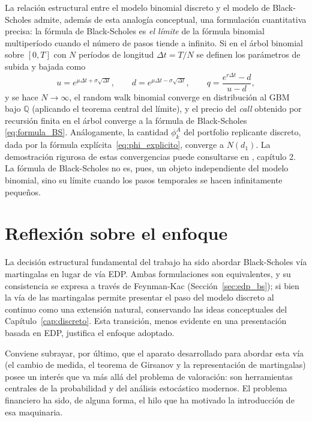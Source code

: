 \documentclass[11pt,a4paper,oneside]{report}
\theoremstyle{plain}
\theoremstyle{definition}
\theoremstyle{remark}
\newcommand{\Q}{\mathbb{Q}}
\newcommand{\1}{\mathbf{1}}
\begin{document}
La relación estructural entre el modelo binomial discreto y el modelo
de Black-Scholes admite, además de esta analogía conceptual, una formulación cuantitativa precisa: la fórmula de Black-Scholes es
\emph{el límite} de la fórmula binomial multiperíodo cuando el número
de pasos tiende a infinito. Si en el árbol binomial sobre $[0, T]$
con $N$ períodos de longitud $\Delta t = T/N$ se definen los
parámetros de subida y bajada como
\begin{equation*}
  u = e^{\mu\Delta t+\sigma\sqrt{\Delta t}}, \qquad
  d = e^{\mu\Delta t-\sigma\sqrt{\Delta t}}, \qquad
  q = \frac{e^{r \Delta t} - d}{u - d},
\end{equation*}
y se hace $N \to \infty$, el random walk binomial converge en
distribución al GBM bajo $\Q$ (aplicando el teorema central
del límite), y el precio del \emph{call} obtenido por recursión finita
en el árbol converge a la fórmula de Black-Scholes
\eqref{eq:formula_BS}. Análogamente, la cantidad $\phi_k^A$ del
portfolio replicante discreto, dada por la fórmula
explícita~\eqref{eq:phi_explicito}, converge a $N(d_1)$. La
demostración rigurosa de estas convergencias puede consultarse en \cite{etheridge}, capítulo 2. La fórmula
de Black-Scholes no es, pues, un objeto independiente del modelo
binomial, sino su límite cuando los pasos temporales se hacen
infinitamente pequeños.

\section{Reflexión sobre el enfoque}
\label{sec:reflexion_enfoque}

La decisión estructural fundamental del trabajo ha sido abordar
Black-Scholes vía martingalas en lugar de vía EDP. Ambas
formulaciones son equivalentes, y su consistencia se expresa a
través de Feynman-Kac (Sección~\ref{sec:edp_bs}); si bien la vía
de las martingalas permite presentar el paso del modelo discreto
al continuo como una extensión natural, conservando las ideas
conceptuales del Capítulo~\ref{cap:discreto}. Esta transición,
menos evidente en una presentación basada en EDP, justifica el enfoque adoptado.


Conviene subrayar, por último, que el aparato desarrollado para abordar
esta vía (el cambio de medida, el teorema de Girsanov y la
representación de martingalas) posee un interés que va más allá del
problema de valoración: son herramientas centrales de la probabilidad y
del análisis estocástico modernos. El problema financiero ha sido,
de alguna forma, el hilo que ha motivado la introducción de
esa maquinaria.
\end{document}
